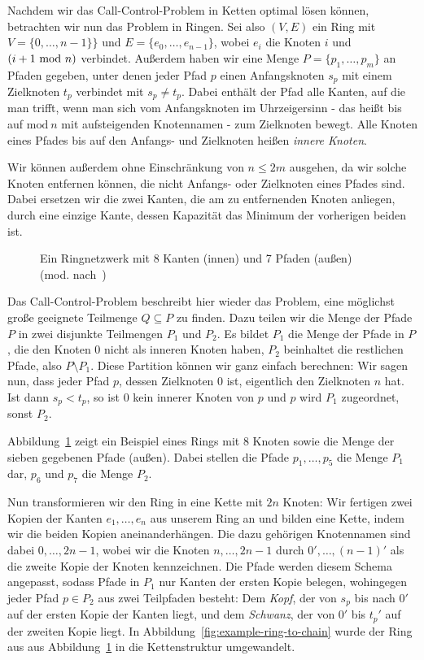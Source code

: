 Nachdem wir das Call-Control-Problem in Ketten optimal lösen können, betrachten wir nun das Problem in Ringen.
Sei also $(V, E)$ ein Ring mit $V=\{0,\dots,n-1 \}\}$ und $E=\{e_0, \dots, e_{n-1}\}$, wobei $e_i$ die
Knoten $i$ und $(i+1 ~\mathrm{mod}~ n)$ verbindet.
Außerdem haben wir eine Menge $P=\{p_1, \dots, p_m\}$ an Pfaden gegeben, unter denen jeder Pfad $p$ einen
Anfangsknoten $s_p$ mit einem Zielknoten $t_p$ verbindet mit $s_p \neq t_p$.
Dabei enthält der Pfad alle Kanten, auf die man trifft, wenn man sich vom Anfangsknoten im Uhrzeigersinn - das heißt
bis auf $\mathrm{mod}~n$ mit aufsteigenden Knotennamen - zum Zielknoten bewegt.
Alle Knoten eines Pfades bis auf den Anfangs- und Zielknoten heißen {\em innere Knoten}.

Wir können außerdem ohne Einschränkung von $n \leq 2m$ ausgehen, da wir solche Knoten entfernen können, die nicht
Anfangs- oder Zielknoten eines Pfades sind.
Dabei ersetzen wir die zwei Kanten, die am zu entfernenden Knoten anliegen, durch eine einzige Kante, dessen
Kapazität das Minimum der vorherigen beiden ist.

\begin{figure}[htbp]
    \centering
    \def\svgwidth{220bp}
    
    \caption{Ein Ringnetzwerk mit 8 Kanten (innen) und 7 Pfaden (außen) (mod. nach~\cite{paper})}
    \label{fig:example-ring}
\end{figure}

Das Call-Control-Problem beschreibt hier wieder das Problem, eine möglichst große geeignete Teilmenge
$Q \subseteq P$ zu finden.
Dazu teilen wir die Menge der Pfade $P$ in zwei disjunkte Teilmengen $P_1$ und $P_2$.
Es bildet $P_1$ die Menge der Pfade in $P$, die den Knoten $0$ nicht als inneren Knoten haben, $P_2$
beinhaltet die restlichen Pfade, also $P \setminus P_1$.
Diese Partition können wir ganz einfach berechnen:
Wir sagen nun, dass jeder Pfad $p$, dessen Zielknoten $0$ ist, eigentlich den Zielknoten $n$ hat.
Ist dann $s_p < t_p$, so ist $0$ kein innerer Knoten von $p$ und $p$ wird $P_1$ zugeordnet, sonst $P_2$.

Abbildung~\ref{fig:example-ring} zeigt ein Beispiel eines Rings mit 8 Knoten sowie die Menge der sieben gegebenen Pfade (außen).
Dabei stellen die Pfade $p_1,\dots,p_5$ die Menge $P_1$ dar, $p_6$ und $p_7$ die Menge $P_2$.


Nun transformieren wir den Ring in eine Kette mit $2n$ Knoten:
Wir fertigen zwei Kopien der Kanten $e_1,\dotsc,e_n$ aus unserem Ring an und bilden eine Kette, indem wir die
beiden Kopien aneinanderhängen.
Die dazu gehörigen Knotennamen sind dabei $0, \dotsc, 2n-1$, wobei wir die Knoten $n, \dotsc, 2n-1$ durch
$0', \dotsc, (n-1)'$ als die zweite Kopie der Knoten kennzeichnen.
Die Pfade werden diesem Schema angepasst, sodass Pfade in $P_1$ nur Kanten der ersten Kopie belegen, wohingegen
jeder Pfad $p \in P_2$ aus zwei Teilpfaden besteht: Dem {\em Kopf}, der von $s_p$ bis nach $0'$ auf der ersten
Kopie der Kanten liegt, und dem {\em Schwanz}, der von $0'$ bis $t_p '$ auf der zweiten Kopie liegt.
In Abbildung~\ref{fig:example-ring-to-chain} wurde der Ring aus aus Abbildung~\ref{fig:example-ring} in die Kettenstruktur umgewandelt.

